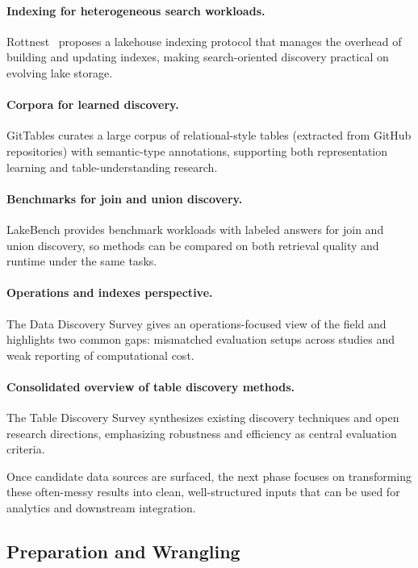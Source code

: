 \documentclass[sigconf]{acmart}
\begin{document}
\paragraph{Indexing for heterogeneous search workloads.}
Rottnest~\cite{11113229} proposes a lakehouse indexing protocol that manages the overhead of building and updating indexes, making search-oriented discovery practical on evolving lake storage.

\paragraph{Corpora for learned discovery.}
GitTables curates a large corpus of relational-style tables (extracted from GitHub repositories) with semantic-type annotations, supporting both representation learning and table-understanding research.

\paragraph{Benchmarks for join and union discovery.}
LakeBench provides benchmark workloads with labeled answers for join and union discovery, so methods can be compared on both retrieval quality and runtime under the same tasks.

\paragraph{Operations and indexes perspective.}
The Data Discovery Survey gives an operations-focused view of the field and highlights two common gaps: mismatched evaluation setups across studies and weak reporting of computational cost.

\paragraph{Consolidated overview of table discovery methods.}
The Table Discovery Survey synthesizes existing discovery techniques and open research directions, emphasizing robustness and efficiency as central evaluation criteria.

Once candidate data sources are surfaced, the next phase focuses on transforming these often-messy results into clean, well-structured inputs that can be used for analytics and downstream integration.


\subsection{Preparation and Wrangling}
\end{document}
